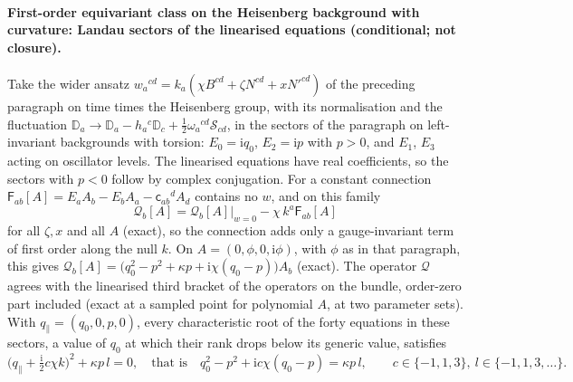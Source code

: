 \paragraph{First-order equivariant class on the Heisenberg background with curvature: Landau sectors of the linearised equations (conditional; not closure).}
Take the wider ansatz \(w_a{}^{cd}=k_a(\chi B^{cd}+\zeta N^{cd}+xN'^{cd})\) of the preceding paragraph on time times the Heisenberg group, with its normalisation and the fluctuation \(\mathbb D_a\to\mathbb D_a-h_a{}^c\mathbb D_c+\tfrac12\omega_a{}^{cd}\mathcal S_{cd}\), in the sectors of the paragraph on left-invariant backgrounds with torsion: \(E_0=\mathrm iq_0\), \(E_2=\mathrm ip\) with \(p>0\), and \(E_1\), \(E_3\) acting on oscillator levels. The linearised equations have real coefficients, so the sectors with \(p<0\) follow by complex conjugation. For a constant connection \(\mathsf F_{ab}[A]=E_aA_b-E_bA_a-\mathsf c_{ab}{}^dA_d\) contains no \(w\), and on this family
\[
\mathcal Q_b[A]=\mathcal Q_b[A]\big|_{w=0}-\chi\,k^a\mathsf F_{ab}[A]
\]
for all \(\zeta,x\) and all \(A\) (exact), so the connection adds only a gauge-invariant term of first order along the null \(k\). On \(A=(0,\phi,0,\mathrm i\phi)\), with \(\phi\) as in that paragraph, this gives \(\mathcal Q_b[A]=\bigl(q_0^2-p^2+\kappa p+\mathrm i\chi(q_0-p)\bigr)A_b\) (exact). The operator \(\mathcal Q\) agrees with the linearised third bracket of the operators on the bundle, order-zero part included (exact at a sampled point for polynomial \(A\), at two parameter sets). With \(q_\parallel=(q_0,0,p,0)\), every characteristic root of the forty equations in these sectors, a value of \(q_0\) at which their rank drops below its generic value, satisfies
\[
\bigl(q_\parallel+\tfrac{\mathrm i}2c\chi k\bigr)^2+\kappa p\,l=0,\quad\text{that is}\quad q_0^2-p^2+\mathrm ic\chi(q_0-p)=\kappa p\,l,\qquad c\in\{-1,1,3\},\ l\in\{-1,1,3,\dots\}.
\]
